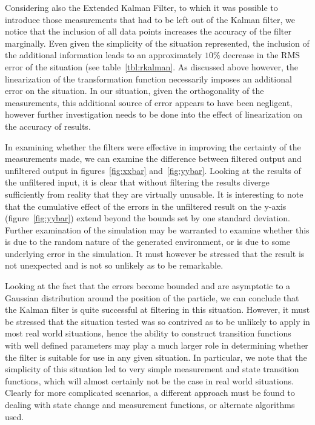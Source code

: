 \documentclass[english]{article}
\begin{document}
Considering also the Extended Kalman Filter, to which it was possible to introduce those measurements that had to be left out of the Kalman filter, we notice that the inclusion of all data points increases the accuracy of the filter marginally. Even given the simplicity of the situation represented, the inclusion of the additional information leads to an approximately $10\%$ decrease in the RMS error of the situation (see table~\ref{tbl:rkalman}. As discussed above however, the linearization of the transformation function necessarily imposes an additional error on the situation. In our situation, given the orthogonality of the measurements, this additional source of error appears to have been negligent, however further investigation needs to be done into the effect of linearization on the accuracy of results.

In examining whether the filters were effective in improving the certainty of the measurements made, we can examine the difference between filtered output and unfiltered output in figures~\ref{fig:xxbar} and~\ref{fig:yybar}. Looking at the results of the unfiltered input, it is clear that without filtering the results diverge sufficiently from reality that they are virtually unusable. It is interesting to note that the cumulative effect of the errors in the unfiltered result on the y-axis (figure~\ref{fig:yybar}) extend beyond the bounds set by one standard deviation. Further examination of the simulation may be warranted to examine whether this is due to the random nature of the generated environment, or is due to some underlying error in the simulation. It must however be stressed that the result is not unexpected and is not so unlikely as to be remarkable.

Looking at the fact that the errors become bounded and are asymptotic to a Gaussian distribution around the position of the particle, we can conclude that the Kalman filter is quite successful at filtering in this situation. However, it must be stressed that the situation tested was so contrived as to be unlikely to apply in most real world situations, hence the ability to construct transition functions with well defined parameters may play a much larger role in determining whether the filter is suitable for use in any given situation. In particular, we note that the simplicity of this situation led to very simple measurement and state transition functions, which will almost certainly not be the case in real world situations. Clearly for more complicated scenarios, a different approach must be found to dealing with state change and measurement functions, or alternate algorithms used.
\end{document}
